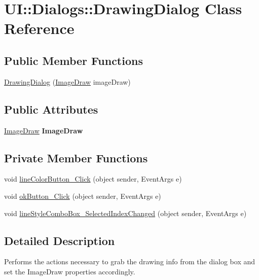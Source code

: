 \hypertarget{class_u_i_1_1_dialogs_1_1_drawing_dialog}{
\section{UI::Dialogs::DrawingDialog Class Reference}
\label{class_u_i_1_1_dialogs_1_1_drawing_dialog}
}
\subsection*{Public Member Functions}
\begin{DoxyCompactItemize}
\item 
\hyperlink{class_u_i_1_1_dialogs_1_1_drawing_dialog_ae813ace4331c45a149293a322e6bbbd4}{DrawingDialog} (\hyperlink{class_core_1_1_manipulators_1_1_image_draw}{ImageDraw} imageDraw)
\end{DoxyCompactItemize}
\subsection*{Public Attributes}
\begin{DoxyCompactItemize}
\item 
\hypertarget{class_u_i_1_1_dialogs_1_1_drawing_dialog_aa60de533b81229d1c4edd0b8ce0583f1}{
\hyperlink{class_core_1_1_manipulators_1_1_image_draw}{ImageDraw} {\bfseries ImageDraw}}
\label{class_u_i_1_1_dialogs_1_1_drawing_dialog_aa60de533b81229d1c4edd0b8ce0583f1}

\end{DoxyCompactItemize}
\subsection*{Private Member Functions}
\begin{DoxyCompactItemize}
\item 
void \hyperlink{class_u_i_1_1_dialogs_1_1_drawing_dialog_a14fc47e4971a3fadfcbcf99be9c3eb4e}{lineColorButton\_\-Click} (object sender, EventArgs e)
\item 
void \hyperlink{class_u_i_1_1_dialogs_1_1_drawing_dialog_a4c405e122958325c0f07fd98ccff8bf2}{okButton\_\-Click} (object sender, EventArgs e)
\item 
void \hyperlink{class_u_i_1_1_dialogs_1_1_drawing_dialog_acda4517c3c2401d544727990f18b8ef6}{lineStyleComboBox\_\-SelectedIndexChanged} (object sender, EventArgs e)
\end{DoxyCompactItemize}


\subsection{Detailed Description}
Performs the actions necessary to grab the drawing info from the dialog box and set the ImageDraw properties accordingly.


